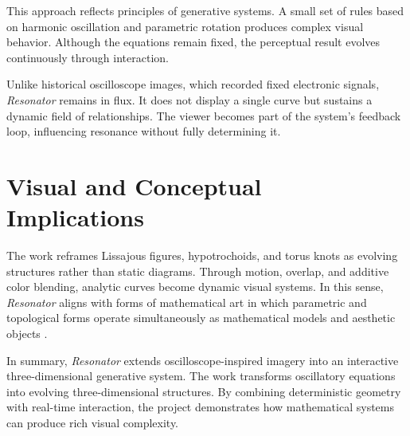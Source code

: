 \documentclass[letterpaper,11pt]{article}
\begin{document}
This approach reflects principles of generative systems. A small set of rules based on harmonic oscillation and parametric rotation produces complex visual behavior. Although the equations remain fixed, the perceptual result evolves continuously through interaction.

Unlike historical oscilloscope images, which recorded fixed electronic signals, \emph{Resonator} remains in flux. It does not display a single curve but sustains a dynamic field of relationships. The viewer becomes part of the system’s feedback loop, influencing resonance without fully determining it.

\section*{Visual and Conceptual Implications}

The work reframes Lissajous figures, hypotrochoids, and torus knots as evolving structures rather than static diagrams. Through motion, overlap, and additive color blending, analytic curves become dynamic visual systems. In this sense, \emph{Resonator} aligns with forms of mathematical art in which parametric and topological forms operate simultaneously as mathematical models and aesthetic objects \cite{sequin2012topological}.

In summary, \emph{Resonator} extends oscilloscope-inspired imagery into an interactive three-dimensional generative system. The work transforms oscillatory equations into evolving three-dimensional structures. By combining deterministic geometry with real-time interaction, the project demonstrates how mathematical systems can produce rich visual complexity.

{\setlength{\baselineskip}{12pt}
\raggedright


}
\end{document}
